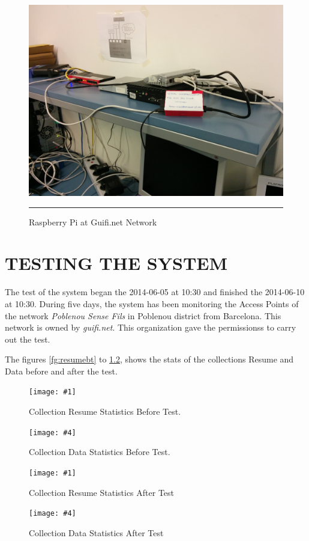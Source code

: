 \documentclass[12pt, a4paper,twoside]{tesi_upf}
\newcommand\TwoFig[6]{%
  \sbox\IBoxA{\texttt{[image: \#1]}}
  \sbox\IBoxB{\texttt{[image: \#4]}}%
  \ifdim\ht\IBoxA>\ht\IBoxB
    \setlength\IHeight{\ht\IBoxB}\else\setlength\IHeight{\ht\IBoxA}\fi%
  \begin{figure}[H]
  \minipage[t]{0.45\textwidth}\centering
  \texttt{[image: \#1]}
  \caption{#2}\label{#3}
  \endminipage\hfill
  \minipage[t]{0.45\textwidth}\centering
  \texttt{[image: \#4]}
  \caption{#5}\label{#6}
  \endminipage 
  \end{figure}%
}
\begin{document}
        \begin{figure}[htbp]
          \centering
              \includegraphics[scale=0.13]{./figures/RaspGuifi.jpg}
              \rule{32em}{0.5pt}
            \caption[Raspberry Pi at Guifi.net Network]{Raspberry Pi at Guifi.net Network}
            \label{fig:snmp}
        \end{figure}
        


 \chapter{TESTING THE SYSTEM}
\label{Chapter5}

The test of the system began the 2014-06-05 at 10:30 and finished the 2014-06-10 at 10:30. During five days, the system has been monitoring the Access Points of the network \emph{Poblenou Sense Fils} in Poblenou district from Barcelona. This network is owned by \textit{guifi.net}. This organization gave the permissionss to carry out the test.

The figures \ref{fg:resumebt} to \ref{fg:dataat}, shows the stats of the collections Resume and Data before and after the test.
    
            \TwoFig{./figures/Resumebt.png}      {Collection Resume Statistics Before Test.}  {fg:resumebt}
       {./figures/Databt.png}{Collection Data Statistics Before Test.}{fg:databt}
       
                   \TwoFig{./figures/ResumeAT.png}      {Collection Resume Statistics After Test}  {fg:resumeat}
       {./figures/DataAT.png}{Collection Data Statistics After Test}{fg:dataat}
        
\end{document}

